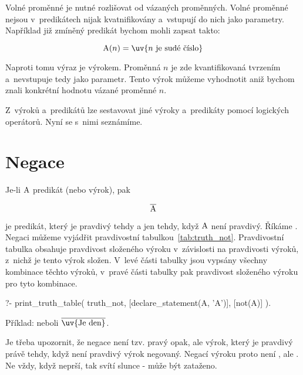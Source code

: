Volné proměnné je nutné rozlišovat od vázaných proměnných. Volné proměnné nejsou v~predikátech nijak kvatnifikovány a~vstupují do nich  jako parametry. Například již zmíněný predikát bychom mohli zapsat takto:

\begin{equation}
\predicate{A}(n) = \text{\uv{\(n\) je sudé číslo}}
\end{equation}

Naproti tomu výraz  je výrokem. Proměnná \(n\) je zde kvantifikovaná tvrzením  a~nevstupuje tedy jako parametr. Tento výrok můžeme vyhodnotit aniž bychom znali konkrétní hodnotu vázané proměnné \(n\).

Z~výroků a~predikátů lze sestavovat jiné výroky a~predikáty pomocí logických operátorů. Nyní se s~nimi seznámíme.

\section{Negace}

Je-li \(\mathrm{A}\) predikát (nebo výrok), pak

\begin{equation}
\overline{\mathrm{A}} 
\end{equation}

je predikát, který je pravdivý tehdy a jen tehdy, když \(\mathrm{A}\) není pravdivý. Říkáme . Negaci můžeme vyjádřit pravdivostní tabulkou~\ref{tab:truth_not}. Pravdivostní tabulka obsahuje pravdivost složeného výroku v~závislosti na pravdivosti výroků, z~nichž je tento výrok složen. V~levé části tabulky jsou vypsány všechny kombinace těchto výroků, v~pravé části tabulky pak pravdivost složeného výroku pro tyto kombinace.  

\begin{prolog}
?- print_truth_table(
	truth_not,
	[declare_statement(A, 'A')],
	[not(A)]
).
\end{prolog}

Příklad:  neboli \(\overline{\predicate{\text{\uv{Je den}}}}\).

Je třeba upozornit, že negace není tzv. pravý opak, ale výrok, který je pravdivý právě tehdy, když není pravdivý výrok negovaný. Negací výroku  proto není , ale . Ne vždy, když neprší, tak svítí slunce - může být zataženo.


